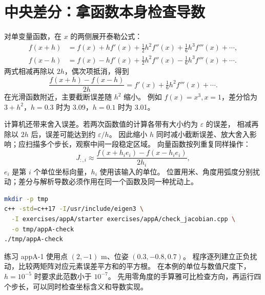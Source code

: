 \section{中央差分：拿函数本身检查导数}
对单变量函数，在 $x$ 的两侧展开泰勒公式：
\begin{align*}
 f(x+h)&=f(x)+hf'(x)+\tfrac12h^2f''(x)+\tfrac16h^3f'''(x)+\cdots,\\
 f(x-h)&=f(x)-hf'(x)+\tfrac12h^2f''(x)-\tfrac16h^3f'''(x)+\cdots.
\end{align*}
两式相减再除以 $2h$，偶次项抵消，得到
\[
 \frac{f(x+h)-f(x-h)}{2h}=f'(x)+\tfrac16h^2f'''(x)+\cdots.
\]
在光滑函数附近，主要截断误差随 $h^2$ 缩小。
例如 $f(x)=x^3,x=1$，差分恰为 $3+h^2$，$h=0.3$ 时为 3.09，$h=0.1$ 时为 3.01。

\begin{center}\begin{minipage}{\linewidth}\makeatletter{}\makeatother
\centering
{}
\caption{中央差分取两侧点的割线斜率。缩小两侧间隔后，割线斜率趋向中间点的切线斜率。}
\end{minipage}\end{center}

计算机还带来舍入误差。若两次函数值的计算各带有大小约为 $\varepsilon$ 的误差，
相减再除以 $2h$ 后，误差可能达到约 $\varepsilon/h$。
因此缩小 $h$ 同时减小截断误差、放大舍入影响；应扫描多个步长，观察中间一段稳定区域。
向量函数按列重复同样操作：
\[
 J_{:,i}\approx\frac{f(x+h_i e_i)-f(x-h_i e_i)}{2h_i},
\]
$e_i$ 是第 $i$ 个单位坐标向量，$h_i$ 使用该输入的单位。
位置用米、角度用弧度分别扰动；差分与解析导数必须作用在同一个函数及同一种扰动上。

\begin{lstlisting}[language=bash,numbers=none]
mkdir -p tmp
c++ -std=c++17 -I/usr/include/eigen3 \
  -I exercises/appA/starter exercises/appA/check_jacobian.cpp \
  -o tmp/appA-check
./tmp/appA-check
\end{lstlisting}
练习 appA-1 使用点 $(2,-1)$ m、位姿 $(0.3,-0.8,0.7)$。
程序逐列建立正负扰动，比较两矩阵对应元素误差平方和的平方根。
在本例的单位与数值尺度下，$h=10^{-5}$ 时要求此范数小于 $10^{-7}$。
先用零角度的手算雅可比检查方向，再运行四个步长，可以同时检查坐标含义和导数实现。

